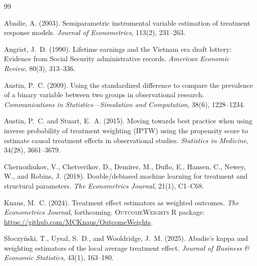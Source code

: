 \documentclass[12pt, a4paper]{article}
\begin{document}

\begin{thebibliography}{99}

Abadie, A. (2003).
\newblock Semiparametric instrumental variable estimation of treatment response
  models.
\newblock \textit{Journal of Econometrics}, 113(2), 231--263.

Angrist, J.~D. (1990).
\newblock Lifetime earnings and the Vietnam era draft lottery: Evidence from
  Social Security administrative records.
\newblock \textit{American Economic Review}, 80(3), 313--336.

Austin, P.~C. (2009).
\newblock Using the standardized difference to compare the prevalence of a
  binary variable between two groups in observational research.
\newblock \textit{Communications in Statistics---Simulation and Computation},
  38(6), 1228--1234.

Austin, P.~C. and Stuart, E.~A. (2015).
\newblock Moving towards best practice when using inverse probability of
  treatment weighting (IPTW) using the propensity score to estimate causal
  treatment effects in observational studies.
\newblock \textit{Statistics in Medicine}, 34(28), 3661--3679.

Chernozhukov, V., Chetverikov, D., Demirer, M., Duflo, E., Hansen, C.,
  Newey, W., and Robins, J. (2018).
\newblock Double/debiased machine learning for treatment and structural
  parameters.
\newblock \textit{The Econometrics Journal}, 21(1), C1--C68.

Knaus, M.~C. (2024).
\newblock Treatment effect estimators as weighted outcomes.
\newblock \textit{The Econometrics Journal}, forthcoming.
\newblock \textsc{OutcomeWeights} R package: \url{https://github.com/MCKnaus/OutcomeWeights}.

S\l{}oczy\'{n}ski, T., Uysal, S.~D., and Wooldridge, J.~M. (2025).
\newblock Abadie's kappa and weighting estimators of the local average
  treatment effect.
\newblock \textit{Journal of Business \& Economic Statistics}, 43(1), 163--180.

\end{thebibliography}
\end{document}
